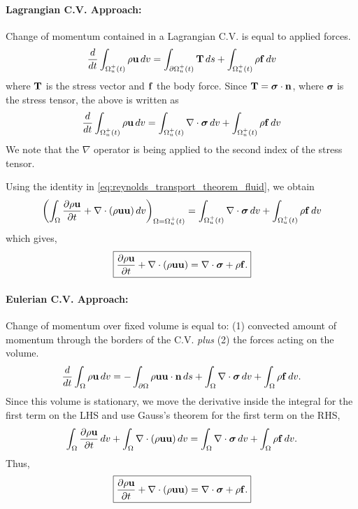 \documentclass[oneside,a4paper,11pt]{report}
\begin{document}
\paragraph{Lagrangian C.V. Approach:}
Change of momentum contained in a Lagrangian C.V. is equal to applied forces.
\begin{equation}
\frac{d}{dt}\int_{\Omega^+_u(t)} \rho \mathbf{u} \, dv = \int_{\partial \Omega^+_u(t)} \mathbf{T}\,ds + \int_{\Omega^+_u(t)} \rho \mathbf{f} \,dv
\end{equation}
where $\mathbf{T}$ is the stress vector and $\mathbf{f}$ the body force. Since $\mathbf{T} = \boldsymbol{\sigma} \cdot \mathbf{n}$, where $\boldsymbol{\sigma}$ is the stress tensor, the above is written as
\begin{equation}
\frac{d}{dt}\int_{\Omega^+_u(t)} \rho \mathbf{u} \, dv = \int_{\Omega^+_u(t)} \nabla \cdot \boldsymbol{\sigma} \,dv + \int_{\Omega^+_u(t)} \rho \mathbf{f} \,dv
\end{equation}
We note that the $\nabla$ operator is being applied to the second index of the stress tensor.

Using the identity in \cref{eq:reynolds_transport_theorem_fluid}, we obtain
\begin{equation}
\left ( \int_{\Omega} \frac{\partial \rho\mathbf{u}}{\partial t} +\nabla\cdot(\rho \mathbf{u} \mathbf{u})\,dv \right)_{\Omega = \Omega^+_u(t)} = \int_{\Omega^+_u(t)} \nabla \cdot \boldsymbol{\sigma} \,dv + \int_{\Omega^+_u(t)} \rho \mathbf{f} \,dv
\end{equation}
which gives,
\begin{equation}
    \boxed{\frac{\partial \rho\mathbf{u} }{\partial t} +\nabla\cdot(\rho\mathbf{u} \mathbf{u}) = \nabla\cdot \boldsymbol{\sigma} +\rho \mathbf{f}.}
\end{equation}

\paragraph{Eulerian C.V. Approach:}
Change of momentum over fixed volume is equal to: (1) convected amount of momentum through the borders of the C.V. \textit{plus} (2) the forces acting on the volume.
\begin{equation}
\frac{d}{dt}\int_\Omega \rho \mathbf{u} \,dv=-\int_{\partial \Omega} \rho \mathbf{u} \mathbf{u} \cdot \mathbf{n} \, ds + \int_{\Omega} \nabla \cdot \boldsymbol{\sigma} \,dv + \int_{\Omega} \rho \mathbf{f} \,dv.
\end{equation}
Since this volume is stationary, we move the derivative inside the integral for the first term on the LHS and use Gauss's theorem for the first term on the RHS,
\begin{eqnarray}
\int_\Omega \frac{\partial \rho \mathbf{u}}{\partial t}\,dv+\int_\Omega \nabla\cdot(\rho\mathbf{u} \mathbf{u})\,dv = \int_\Omega \nabla\cdot \boldsymbol{\sigma} \,dv + \int_\Omega \rho \mathbf{f} \,dv .
\end{eqnarray}
Thus,
\begin{equation}
    \label{eq:momentum_conservation_vector}
    \boxed{\frac{\partial \rho\mathbf{u} }{\partial t} + \nabla \cdot (\rho \mathbf{u} \mathbf{u} ) =  \nabla\cdot \boldsymbol{\sigma} + \rho \mathbf{f}.}
\end{equation}
\end{document}
